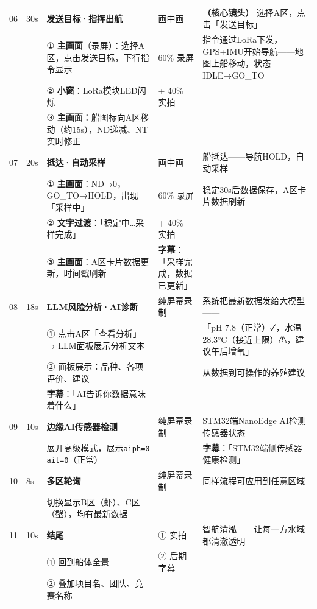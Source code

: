 \documentclass[12pt,a4paper]{article}
\begin{document}
\begin{longtable}{>{\centering\arraybackslash}p{0.7cm}|p{0.9cm}|p{5cm}|p{2.8cm}|p{5.5cm}}
\rowcolor{colB}
06 & 30s & \textbf{发送目标·指挥出航} & 画中画 & \textbf{（核心镜头）} 选择A区，点击「发送目标」 \\
  & & ① \textbf{主画面}（录屏）：选择A区，点击发送目标，下行指令显示 & 60\% 录屏 & 指令通过LoRa下发，GPS+IMU开始导航——地图上船移动，状态IDLE→GO\_TO \\
  & & ② \textbf{小窗}：LoRa模块LED闪烁 & + 40\% 实拍 & \\
  & & ③ \textbf{主画面}：船图标向A区移动（约15s），ND递减、NT实时修正 & & \\
\hline

\rowcolor{colC}
07 & 20s & \textbf{抵达·自动采样} & 画中画 & 船抵达——导航HOLD，自动采样 \\
  & & ① \textbf{主画面}：ND→0，GO\_TO→HOLD，出现「采样中」 & 60\% 录屏 & 稳定30s后数据保存，A区卡片数据刷新 \\
  & & ② \textbf{文字过渡}：「稳定中…采样完成」 & + 40\% 实拍 & \\
  & & ③ \textbf{主画面}：A区卡片数据更新，时间戳刷新 & \textbf{字幕}：「采样完成，数据已更新」 & \\
\hline

\rowcolor{colA}
08 & 18s & \textbf{LLM风险分析·AI诊断} & 纯屏幕录制 & 系统把最新数据发给大模型—— \\
  & & ① 点击A区「查看分析」→ LLM面板展示分析文本 & & 「pH 7.8（正常）✓，水温28.3°C（接近上限）⚠，建议午后增氧」 \\
  & & ② 面板展示：品种、各项评价、建议 & & 从数据到可操作的养殖建议 \\
  & & \textbf{字幕}：「AI告诉你数据意味着什么」 & & \\
\hline

\rowcolor{colB}
09 & 10s & \textbf{边缘AI传感器检测} & 纯屏幕录制 & STM32端NanoEdge AI检测传感器状态 \\
  & & 展开高级模式，展示\texttt{aiph=0 ait=0}（正常） & & \textbf{字幕}：「STM32端侧传感器健康检测」 \\
\hline

\rowcolor{colC}
10 & 8s & \textbf{多区轮询} & 纯屏幕录制 & 同样流程可应用到任意区域 \\
  & & 切换显示B区（虾）、C区（蟹），均有最新数据 & & \\
\hline

\rowcolor{colA}
11 & 10s & \textbf{结尾} & ① 实拍 & 智航清泓——让每一方水域都清澈透明 \\
  & & ① 回到船体全景 & ② 后期字幕 & \\
  & & ② 叠加项目名、团队、竞赛名称 & & \\
\hline
\end{longtable}
\end{document}
